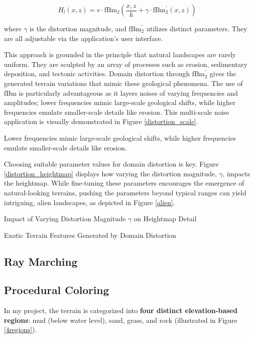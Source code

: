\begin{equation}
    H_l(x,z) = v\cdot\text{fBm}_{2}\left(\frac{x,z}{h}+\gamma\cdot\text{fBm}^\prime_2(x,z)\right)
\end{equation}

where $\gamma$ is the distortion magnitude, and $\text{fBm}^\prime_2$ utilizes distinct parameters. They are all adjustable via the application’s user interface.

This approach is grounded in the principle that natural landscapes are rarely uniform. They are sculpted by an array of processes such as erosion, sedimentary deposition, and tectonic activities. Domain distortion through $\text{fBm}^\prime_2$ gives the generated terrain variations that mimic these geological phenomena. The use of fBm is particularly advantageous as it layers noises of varying frequencies and amplitudes; lower frequencies mimic large-scale geological shifts, while higher frequencies emulate smaller-scale details like erosion. This multi-scale noise application is visually demonstrated in Figure \ref{distortion_scale}.

{Lower frequencies mimic large-scale geological shifts, while higher frequencies emulate smaller-scale details like erosion.}

Choosing suitable parameter values for domain distortion is key.  Figure \ref{distortion_heightmap} displays how varying the distortion magnitude, $\gamma$, impacts the heightmap. While fine-tuning these parameters encourages the emergence of natural-looking terrains, pushing the parameters beyond typical ranges can yield intriguing, alien landscapes, as depicted in Figure \ref{alien}.

{Impact of Varying Distortion Magnitude $\gamma$ on Heightmap Detail}

{Exotic Terrain Features Generated by Domain Distortion}

\subsection{Ray Marching}
\label{Terrain Raymarching}

\subsection{Procedural Coloring}
\label{Terrain Procedural Texturing}

In my project, the terrain is categorized into \textbf{four distinct elevation-based regions}: mud (below water level), sand, grass, and rock (illustrated in Figure \ref{4regions}).

